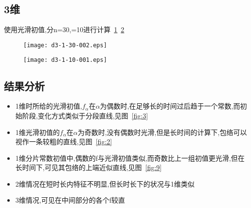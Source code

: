 \documentclass[UTF8]{ctexart}
\begin{document}
\subsection{3维}
使用光滑初值,分n=30,=10进行计算~\ref{fig:11}~\ref{fig:12}
\begin{figure}[htbp]
\centering\texttt{[image: d3-1-30-002.eps]}
\caption{}\label{fig:11}
\end{figure}

\begin{figure}[htbp]
\centering\texttt{[image: d3-1-10-001.eps]}
\caption{}\label{fig:12}
\end{figure}
\subsection{结果分析}
\begin{itemize}
  \item 1维时所给的光滑初值,$f_{\alpha}$在$\alpha$为偶数时,在足够长的时间过后趋于一个常数,而初始阶段,变化方式类似于分段直线,见图~\ref{fig:3}
  \item 1维光滑初值的$f_{\alpha}$在$\alpha$为奇数时,没有偶数时光滑,但是长时间的计算下,包络可以视作一条较粗的直线,见图~\ref{fig:2}
  \item 1维分片常数初值中,偶数的f与光滑初值类似,而奇数比上一组初值更光滑,但在长时间下,可见其包络的上端近似直线,见图~\ref{fig:9}
  \item 2维情况在短时长内特征不明显,但长时长下的状况与1维类似
  \item 3维情况,可见在中间部分的各个f较直
\end{itemize}
  
\end{document}

